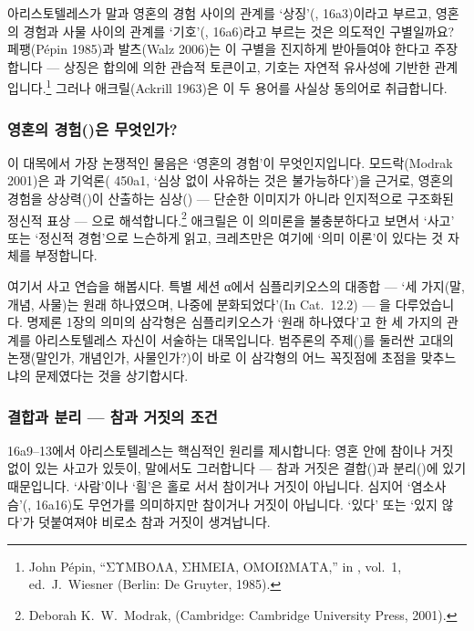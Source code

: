 \documentclass[12pt, a4paper]{article}
\begin{document}
아리스토텔레스가 말과 영혼의 경험 사이의 관계를 `상징'(, 16a3)이라고 부르고, 영혼의 경험과 사물 사이의 관계를 `기호'(, 16a6)라고 부르는 것은 의도적인 구별일까요? 페팽(Pépin 1985)과 발츠(Walz 2006)는 이 구별을 진지하게 받아들여야 한다고 주장합니다 --- 상징은 합의에 의한 관습적 토큰이고, 기호는 자연적 유사성에 기반한 관계입니다.\footnote{John Pépin, ``ΣΥΜΒΟΛΑ, ΣΗΜΕΙΑ, ΟΜΟΙΩΜΑΤΑ,'' in , vol.\ 1, ed.\ J.\ Wiesner (Berlin: De Gruyter, 1985).} 그러나 애크릴(Ackrill 1963)은 이 두 용어를 사실상 동의어로 취급합니다.

\subsubsection{영혼의 경험()은 무엇인가?}

이 대목에서 가장 논쟁적인 물음은 `영혼의 경험'이 무엇인지입니다. 모드락(Modrak 2001)은 과 기억론( 450a1, `심상 없이 사유하는 것은 불가능하다')을 근거로, 영혼의 경험을 상상력()이 산출하는 심상() --- 단순한 이미지가 아니라 인지적으로 구조화된 정신적 표상 --- 으로 해석합니다.\footnote{Deborah K.\ W.\ Modrak,  (Cambridge: Cambridge University Press, 2001).} 애크릴은 이 의미론을 불충분하다고 보면서 `사고' 또는 `정신적 경험'으로 느슨하게 읽고, 크레츠만은 여기에 `의미 이론'이 있다는 것 자체를 부정합니다.

여기서 사고 연습을 해봅시다. 특별 세션 α에서 심플리키오스의 대종합 --- `세 가지(말, 개념, 사물)는 원래 하나였으며, 나중에 분화되었다'(In Cat.\ 12.2) --- 을 다루었습니다. 명제론 1장의 의미의 삼각형은 심플리키오스가 `원래 하나였다'고 한 세 가지의 관계를 아리스토텔레스 자신이 서술하는 대목입니다. 범주론의 주제()를 둘러싼 고대의 논쟁(말인가, 개념인가, 사물인가?)이 바로 이 삼각형의 어느 꼭짓점에 초점을 맞추느냐의 문제였다는 것을 상기합시다.

\subsubsection{결합과 분리 --- 참과 거짓의 조건}

16a9--13에서 아리스토텔레스는 핵심적인 원리를 제시합니다: 영혼 안에 참이나 거짓 없이 있는 사고가 있듯이, 말에서도 그러합니다 --- 참과 거짓은 결합()과 분리()에 있기 때문입니다. `사람'이나 `흼'은 홀로 서서 참이거나 거짓이 아닙니다. 심지어 `염소사슴'(, 16a16)도 무언가를 의미하지만 참이거나 거짓이 아닙니다. `있다' 또는 `있지 않다'가 덧붙여져야 비로소 참과 거짓이 생겨납니다.
\end{document}
